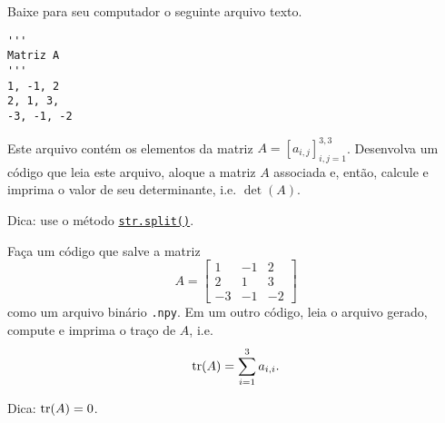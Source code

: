 \begin{exer}
  Baixe para seu computador o seguinte arquivo texto.
\begin{lstlisting}[caption=mat.txt]
'''
Matriz A
'''
1, -1, 2
2, 1, 3,
-3, -1, -2
\end{lstlisting}
  Este arquivo contém os elementos da matriz $A = [a_{i,j}]_{i,j=1}^{3,3}$. Desenvolva um código que leia este arquivo, aloque a matriz $A$ associada e, então, calcule e imprima o valor de seu determinante, i.e. $\det(A)$.
\end{exer}
\begin{resp}
  Dica: use o método \href{https://docs.python.org/3/library/stdtypes.html#str.split}{\lstinline+str.split()+}.
\end{resp}

\begin{exer}
  Faça um código que salve a matriz
  \begin{equation}
    A =
    \begin{bmatrix}
      1 & -1 & 2\\
      2 & 1 & 3\\
      -3 & -1 & -2
    \end{bmatrix}
  \end{equation}
  como um arquivo binário \lstinline+.npy+. Em um outro código, leia o arquivo gerado, compute e imprima o traço de $A$, i.e.
  \begin{equation}
    \operatorname{tr}(A) = \sum_{i=1}^3 a_{i,i}.
  \end{equation}
\end{exer}
\begin{resp}
  Dica: $\operatorname{tr}(A) = 0$.
\end{resp}

